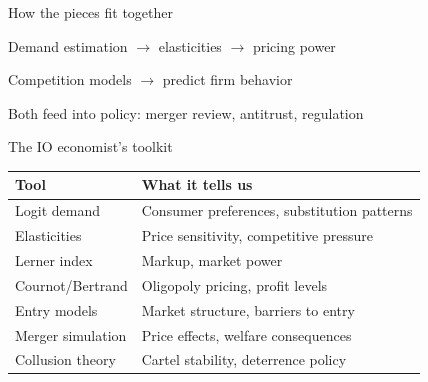 \documentclass[notes,11pt, aspectratio=169]{beamer}
\newenvironment{wideitemize}{\itemize\addtolength{\itemsep}{10pt}}{\enditemize}
\begin{document}
\begin{frame}{How the pieces fit together}
	\begin{center}
	\end{center}
	\vspace{5pt}
	\begin{wideitemize}
		\item Demand estimation $\rightarrow$ elasticities $\rightarrow$ pricing power
		\item Competition models $\rightarrow$ predict firm behavior
		\item Both feed into policy: merger review, antitrust, regulation
	\end{wideitemize}
\end{frame}

\begin{frame}{The IO economist's toolkit}
	\begin{center}
		\begin{tabular}{|p{4cm}|p{7cm}|}
			\hline
			\textbf{Tool} & \textbf{What it tells us} \\
			\hline
			Logit demand & Consumer preferences, substitution patterns \\
			\hline
			Elasticities & Price sensitivity, competitive pressure \\
			\hline
			Lerner index & Markup, market power \\
			\hline
			Cournot/Bertrand & Oligopoly pricing, profit levels \\
			\hline
			Entry models & Market structure, barriers to entry \\
			\hline
			Merger simulation & Price effects, welfare consequences \\
			\hline
			Collusion theory & Cartel stability, deterrence policy \\
			\hline
		\end{tabular}
	\end{center}
\end{frame}
\end{document}
